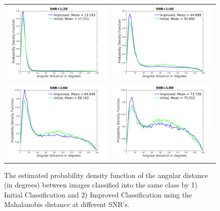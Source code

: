 \documentclass{article}
\begin{document}
\begin{figure}[!htbp]
\begin{center}
\begin{tabular}{cc}
\includegraphics[width=.49\columnwidth]{fighist_snr1by20.png} & \includegraphics[width=.49\columnwidth]{fighist_snr1by40.png} \\
\includegraphics[width=.49\columnwidth]{fighist_snr1by60.png} & \includegraphics[width=.49\columnwidth]{fighist_snr1by80.png}
\end{tabular}
\end{center}
\caption{The estimated probability density function of the angular distance (in degrees) between images classified into the same class by 1) Initial Classification and 2) Improved Classification using the Mahalanobis distance at different SNR's.}
\label{fig:hist}
\end{figure}
\end{document}
